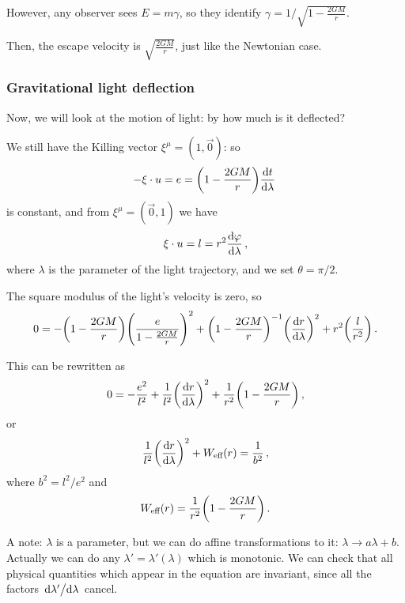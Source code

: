 \documentclass[main.tex]{subfiles}
\begin{document}
However, any observer sees \(E = m \gamma \), so they identify \(\gamma = 1 / \sqrt{1 - \frac{2GM}{r}}\). 

Then, the escape velocity is \(\sqrt{\frac{2GM}{r}}\), just like the Newtonian case. 

\subsubsection{Gravitational light deflection}

Now, we will look at the motion of light: by how much is it deflected? 

We still have the Killing vector \(\xi^{\mu } = (1, \vec{0})\): so 
%
\begin{align}
  - \xi \cdot u = e = \qty(1 - \frac{2GM}{r}) \dv{t}{\lambda } 
\,
\end{align}
%
is constant, and from \(\xi^{\mu }= (\vec{0}, 1)\) we have 
%
\begin{align}
  \xi \cdot u =  l =
  r^2 \dv{\varphi }{\lambda }
\,,
\end{align}
%
where \(\lambda \) is the parameter of the light trajectory, and we set \(\theta = \pi /2\). 

The square modulus of the light's velocity is zero, so 
%
\begin{align}
  0 =
  - \qty(1 - \frac{2GM}{r}) \qty(\frac{e}{1-\frac{2GM}{r}})^2
  + \qty(1 - \frac{2GM}{r})^{-1} \qty(\dv{r}{\lambda })^2 + r^2 \qty(\frac{l}{r^2})
\,. 
\end{align}

This can be rewritten as 
%
\begin{align}
  0= - \frac{e^2}{l^2} + \frac{1}{l^2} \qty(\dv{r}{\lambda })^2 + \frac{1}{r^2} \qty(1 - \frac{2GM}{r})
\,,
\end{align}
%
or 
%
\begin{align}
  \frac{1}{l^2} \qty(\dv{r}{\lambda })^2 + W _{\text{eff}}(r) = \frac{1}{b^2}
\,,
\end{align}
%
where \(b^2 = l^2 / e^2\) and 
%
\begin{align}
  W _{\text{eff}} (r) = \frac{1}{r^2} \qty(1 - \frac{2GM}{r})
\,.
\end{align}

A note: \(\lambda \) is a parameter, but we can do affine transformations to it: \(\lambda \rightarrow a \lambda + b\). Actually we can do any \(\lambda' = \lambda' (\lambda )\) which is monotonic. 
We can check that all physical quantities which appear in the equation are invariant, since all the factors \(\dv*{\lambda ' }{\lambda }\) cancel. 
\end{document}

